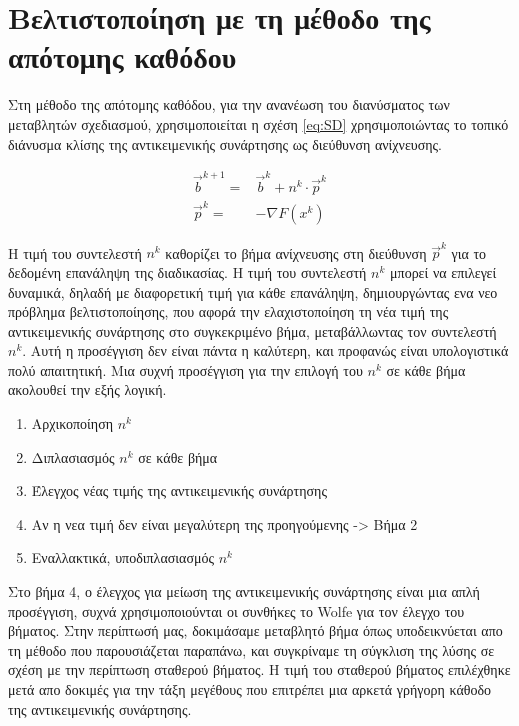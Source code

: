\section{Βελτιστοποίηση με τη μέθοδο της απότομης καθόδου} %

Στη μέθοδο της απότομης καθόδου, για την ανανέωση του διανύσματος των μεταβλητών σχεδιασμού, χρησιμοποιείται η σχέση \ref{eq:SD} χρησιμοποιώντας το τοπικό διάνυσμα κλίσης της αντικειμενικής συνάρτησης ως διεύθυνση ανίχνευσης.

\begin{equation}
\begin{aligned}
   \vec{b}^{k+1} =& \vec{b}^{k} + n^k\cdot\vec{p}^k\\
\vec{p}^k = & - \nabla F(x^k)
\end{aligned}
    \label{eq:SD}
\end{equation}

Η τιμή του συντελεστή $n^k$ καθορίζει το βήμα ανίχνευσης στη διεύθυνση $\vec{p}^k$ για το δεδομένη επανάληψη της διαδικασίας. Η τιμή του συντελεστή $n^k$ μπορεί να επιλεγεί δυναμικά, δηλαδή με διαφορετική τιμή για κάθε επανάληψη, δημιουργώντας ενα νεο πρόβλημα βελτιστοποίησης, που αφορά την ελαχιστοποίηση τη νέα τιμή της αντικειμενικής συνάρτησης στο συγκεκριμένο βήμα, μεταβάλλωντας τον συντελεστή $n^k$. Αυτή η προσέγγιση δεν είναι πάντα η καλύτερη, και προφανώς είναι υπολογιστικά πολύ απαιτητική. Μια συχνή προσέγγιση για την επιλογή του $n^k$ σε κάθε βήμα ακολουθεί την εξής λογική. 

\begin{enumerate}
    \item Αρχικοποίηση $n^k$
    \item Διπλασιασμός $n^k$ σε κάθε βήμα
    \item Έλεγχος νέας τιμής της αντικειμενικής συνάρτησης
    \item Αν η νεα τιμή δεν είναι μεγαλύτερη της προηγούμενης -> Βήμα 2
    \item Εναλλακτικά, υποδιπλασιασμός $n^k$
\end{enumerate}

Στο βήμα 4, ο έλεγχος για μείωση της αντικειμενικής συνάρτησης είναι μια απλή προσέγγιση, συχνά χρησιμοποιούνται οι συνθήκες το Wolfe για τον έλεγχο του βήματος. Στην περίπτωσή μας, δοκιμάσαμε μεταβλητό βήμα όπως υποδεικνύεται απο τη μέθοδο που παρουσιάζεται παραπάνω, και συγκρίναμε τη σύγκλιση της λύσης σε σχέση με την περίπτωση σταθερού βήματος. Η τιμή του σταθερού βήματος επιλέχθηκε μετά απο δοκιμές για την τάξη μεγέθους που επιτρέπει μια αρκετά γρήγορη κάθοδο της αντικειμενικής συνάρτησης.

